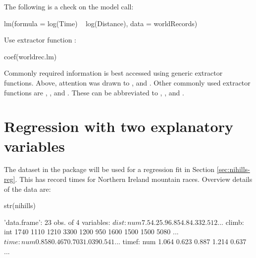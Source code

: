 The following is a check on the model call:
\begin{fullwidth}

\begin{Schunk}
\begin{Soutput}
lm(formula = log(Time) ~ log(Distance), data = worldRecords)
\end{Soutput}
\end{Schunk}

\end{fullwidth}

\begin{marginfigure}[40pt]
Use extractor function :\\[-3pt]
\begin{Schunk}
\begin{Sinput}
coef(worldrec.lm)
\end{Sinput}
\end{Schunk}
\end{marginfigure}
Commonly required information is best accessed using generic
extractor functions.  Above, attention was drawn to ,
 and .  Other commonly used extractor
functions are , , and
. These can be abbreviated to ,
, and .

\section{Regression with two explanatory variables}\label{sec:nihills}

The dataset  in the  package will be used for
a regression fit in Section \ref{sec:nihills-reg}.  This has record
times for Northern Ireland mountain races. Overview details of the
data are:
\begin{fullwidth}
\begin{Schunk}
\begin{Sinput}
str(nihills)
\end{Sinput}
\begin{Soutput}
'data.frame':	23 obs. of  4 variables:
 $ dist : num  7.5 4.2 5.9 6.8 5 4.8 4.3 3 2.5 12 ...
 $ climb: int  1740 1110 1210 3300 1200 950 1600 1500 1500 5080 ...
 $ time : num  0.858 0.467 0.703 1.039 0.541 ...
 $ timef: num  1.064 0.623 0.887 1.214 0.637 ...
\end{Soutput}
\end{Schunk}
\end{fullwidth}



